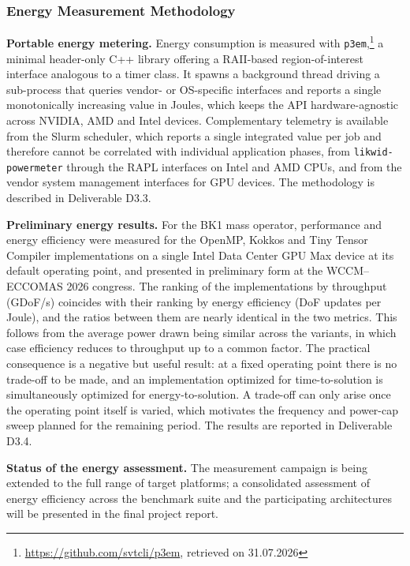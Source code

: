 \documentclass[a4paper,12pt, numbers]{article}
\begin{document}
\subsubsection*{Energy Measurement Methodology}

\noindent\textbf{Portable energy metering.}
Energy consumption is measured with \texttt{p3em},\footnote{\url{https://github.com/svtcli/p3em}, retrieved on 31.07.2026} a minimal header-only C++ library offering a RAII-based region-of-interest interface analogous to a timer class. It spawns a background thread driving a sub-process that queries vendor- or OS-specific interfaces and reports a single monotonically increasing value in Joules, which keeps the API hardware-agnostic across NVIDIA, AMD and Intel devices. Complementary telemetry is available from the Slurm scheduler, which reports a single integrated value per job and therefore cannot be correlated with individual application phases, from \texttt{likwid-powermeter} through the RAPL interfaces on Intel and AMD CPUs, and from the vendor system management interfaces for GPU devices. The methodology is described in Deliverable D3.3.

\noindent\textbf{Preliminary energy results.}
For the BK1 mass operator, performance and energy efficiency were measured for the OpenMP, Kokkos and Tiny Tensor Compiler implementations on a single Intel Data Center GPU Max device at its default operating point, and presented in preliminary form at the WCCM--ECCOMAS 2026 congress. The ranking of the implementations by throughput (GDoF/s) coincides with their ranking by energy efficiency (DoF updates per Joule), and the ratios between them are nearly identical in the two metrics. This follows from the average power drawn being similar across the variants, in which case efficiency reduces to throughput up to a common factor. The practical consequence is a negative but useful result: at a fixed operating point there is no trade-off to be made, and an implementation optimized for time-to-solution is simultaneously optimized for energy-to-solution. A trade-off can only arise once the operating point itself is varied, which motivates the frequency and power-cap sweep planned for the remaining period. The results are reported in Deliverable D3.4.

\noindent\textbf{Status of the energy assessment.}
The measurement campaign is being extended to the full range of target platforms; a consolidated assessment of energy efficiency across the benchmark suite and the participating architectures will be presented in the final project report.
\end{document}
